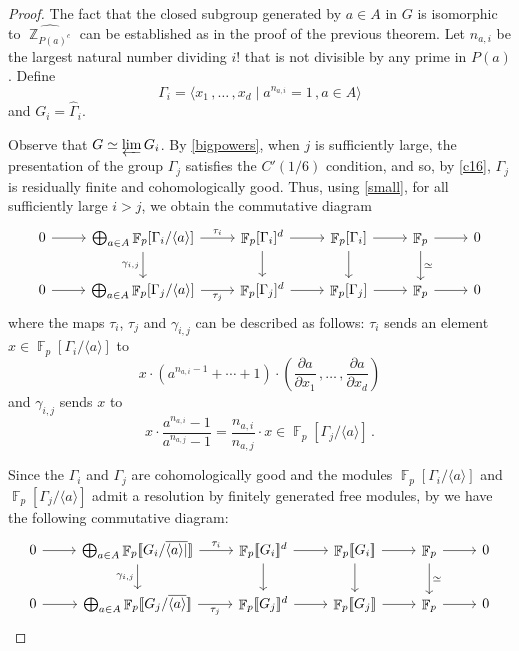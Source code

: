 \documentclass[a4paper]{amsart}
\theoremstyle{definition}
\theoremstyle{remark}
\DeclareMathOperator{\bbz}{\mathbb{Z}}
\DeclareMathOperator{\bbf}{\mathbb{F}}
\newcommand{\Falgebra}[1]{\bbf_p[#1]}
\newcommand{\FFalgebra}[1]{\bbf_p[\![#1]\!]}
\begin{document}
\begin{proof} The fact that the closed subgroup generated by \(a \in A\) in \(G\) is isomorphic to \(\widehat{\bbz_{P(a)^c}}\) can be established as in the proof of the previous theorem. Let \(n_{a,i}\) be the largest natural number dividing \(i!\) that is not divisible by any prime in \(P(a)\). Define
\[\Gamma_i = \langle x_1\,,\ldots\,, x_d \mid a^{n_{a,i}} = 1\,, a \in A\rangle\] and \(G_i = \widehat{\Gamma}_i\).

Observe that \(G \simeq \varprojlim G_i\). By \cref{bigpowers}, when \(j\) is sufficiently large, the presentation of the group \(\Gamma_j \) satisfies the \(C'(1/6)\) condition, and so, by \cref{c16}, \(\Gamma_j\) is residually finite and cohomologically good. Thus, using \cref{small}, for all sufficiently large \(i > j\), we obtain the commutative diagram
\[\begin{tikzcd}
0 \arrow[r] & \bigoplus_{a \in A} \Falgebra{\Gamma_i/\langle a \rangle} \arrow[d, "{\gamma_{i,j}}"'] \arrow[r, "\tau_i"] & \Falgebra{\Gamma_i}^d \arrow[d] \arrow[r] & \Falgebra{\Gamma_i} \arrow[d] \arrow[r] & \bbf_p \arrow[d, "\simeq"] \arrow[r] & 0 \\
0 \arrow[r] & \bigoplus_{a \in A} \Falgebra{\Gamma_j/\langle a \rangle} \arrow[r, "\tau_j"']                              & \Falgebra{\Gamma_j}^d \arrow[r]           & \Falgebra{\Gamma_j} \arrow[r]           & \bbf_p \arrow[r]                     & 0
\end{tikzcd}
\]
where the maps \(\tau_i\), \(\tau_j\) and \(\gamma_{i,j}\) can be described as follows: \(\tau_i\) sends an element \(x \in \Falgebra{\Gamma_i/\langle a \rangle}\) to \[x\cdot (a^{n_{a,i}-1} + \cdots + 1)\cdot \left(\frac{\partial a}{\partial x_1}\,,\ldots\,, \frac{\partial a}{\partial x_d}\right)\] and \(\gamma_{i,j}\) sends \(x\) to \begin{equation}\label{eqgamma} x\cdot \frac{a^{n_{a,i}}-1}{a^{n_{a,j}}-1} = \frac{n_{a,i}}{n_{a,j}}\cdot x \in \Falgebra{\Gamma_j/\langle a \rangle}\,.\end{equation}

Since the \(\Gamma_i\) and \(\Gamma_j\) are cohomologically good and the modules \(\Falgebra{\Gamma_i/\langle a \rangle}\) and \(\Falgebra{\Gamma_j/\langle a \rangle}\) admit a resolution by finitely generated free modules, by \cite[Thm. 7.3.12]{Wilkes} we have the following commutative diagram:
\[
\begin{tikzcd}
0 \arrow[r] & \bigoplus_{a \in A} \FFalgebra{G_i/\overline{\langle a \rangle|}} \arrow[d, "{\gamma_{i,j}}"'] \arrow[r, "\tau_i"] & \FFalgebra{G_i}^d \arrow[d] \arrow[r] & \FFalgebra{G_i} \arrow[d] \arrow[r] & \bbf_p \arrow[d, "\simeq"] \arrow[r] & 0 \\
0 \arrow[r] & \bigoplus_{a \in A} \FFalgebra{G_j/\overline{\langle a \rangle}} \arrow[r, "\tau_j"']                              & \FFalgebra{G_j}^d \arrow[r]           & \FFalgebra{G_j} \arrow[r]           & \bbf_p \arrow[r]                     & 0
\end{tikzcd}
\]


\end{proof}
\end{document}
